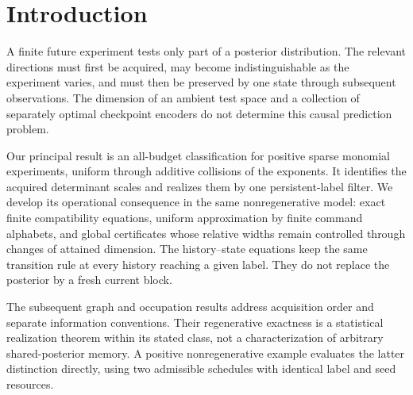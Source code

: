 \section{Introduction}
A finite future experiment tests only part of a posterior distribution.
The relevant directions must first be acquired, may become indistinguishable
as the experiment varies, and must then be preserved by one state through
subsequent observations. The dimension of an ambient test space and a
collection of separately optimal checkpoint encoders do not determine
this causal prediction problem.

Our principal result is an all-budget classification for positive sparse
monomial experiments, uniform through additive collisions of the exponents.
It identifies the acquired determinant scales and realizes them by one
persistent-label filter. We develop its operational consequence in the
same nonregenerative model: exact finite compatibility equations, uniform
approximation by finite command alphabets, and global certificates whose
relative widths remain controlled through changes of attained dimension.
The history--state equations keep the same transition rule at every
history reaching a given label. They do not replace the posterior by a
fresh current block.

The subsequent graph and occupation results address acquisition order and
separate information conventions. Their regenerative exactness is a
statistical realization theorem within its stated class, not a
characterization of arbitrary shared-posterior memory. A positive
nonregenerative example evaluates the latter distinction directly, using
two admissible schedules with identical label and seed resources.

